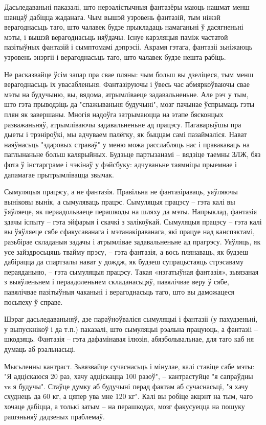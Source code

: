 Дасьледаваньні паказалі, што нерэалістычныя фантазёры маюць нашмат менш шанцаў дабіцца жаданага. Чым вышэй узровень фантазій, тым ніжэй верагоднасьць таго, што чалавек будзе прыкладаць намаганьні ў дасягненьні мэты, і вышэй верагоднасьць няўдачы. Існуе карэляцыя паміж частатой пазітыўных фантазій і сымптомамі дэпрэсіі. Акрамя гэтага, фантазіі зьніжаюць узровень энэргіі і верагоднасьць таго, што чалавек будзе нешта рабіць.

Не расказвайце ўсім запар пра свае пляны: чым больш вы дзеліцеся, тым менш верагоднасьць іх увасабленьня. Фантазіруючы і ўвесь час абмяркоўваючы свае мэты на будучыню, вы, вядома, атрымліваеце задавальненьне. Але рэч у тым, што гэта прыводзіць да "спажываньня будучыні", мозг пачынае ўспрымаць гэты плян як завершаны. Многія надоўга затрымаюцца на этапе бясконцых разважаньняў, атрымліваючы задавальненьне ад працэсу. Пагаварыўшы пра дыеты і трэніроўкі, мы адчуваем палёгку, як быццам самі пазаймаліся. Нават наяўнасьць "здаровых страваў" у меню можа расслабляць нас і правакаваць на паглынаньне больш калярыйных. Будзьце партызанамі – вядзіце таемны ЗЛЖ, бяз фота ў інстарграме і чэкінаў у фэйсбуку: адчуваньне таямніцы прыемнае і дапамагае прытрымлівацца звычак.

Сымуляцыя працэсу, а не фантазія. Правільна не фантазіраваць, уяўляючы выніковы вынік, а сымуляваць працэс. Сымуляцыя працэсу – гэта калі вы ўяўляеце, як пераадольваеце перашкоды на шляху да мэты. Напрыклад, фантазія здачы іспыту – гэта эйфарыя і скачкі з залікоўкай. Сымуляцыя працэсу – гэта калі вы ўяўляеце сябе сфакусаванага і мэтанакіраванага, які працуе над канспэктамі, разьбірае складаныя задачы і атрымлівае задавальненьне ад прагрэсу. Уяўляць, як усе зайздросьцяць твайму прэсу, – гэта фантазія, а вось плянаваць, як будзеш дабірацца да спартзалы нават у дождж, як будзеш супрацьстаяць стрэсаваму пераяданьню, – гэта сымуляцыя працэсу. Такая «нэгатыўная фантазія», зьвязаная з выяўленьнем і пераадоленьнем складанасьцяў, павялічвае веру ў сябе, павялічвае пазітыўныя чаканьні і верагоднасьць таго, што вы даможацеся посьпеху ў справе.

Шэраг дасьледаваньняў, дзе параўноўваліся сымуляцыі і фантазіі (у пахудзеньні, у выпускнікоў і да т.п.) паказалі, што сымуляцыі рэальна працуюць, а фантазіі – шкодзяць. Фантазія – гэта дафамінавая ілюзія, абязбольвальнае, для таго каб ня думаць аб рэальнасьці.

Мысьленны кантраст. Зьвязвайце сучаснасьць і мінулае, калі ставіце сабе мэты: "Я адціскаюся 20 раз, хачу адціскацца 100 разоў", – кантрастуйце "я сапраўдны vs я будучы". Стаўце думку аб будучыні перад фактам аб сучаснасьці, "я хачу схуднець да 60 кг, а цяпер ува мне 120 кг". Калі вы робіце акцэнт на тым, чаго хочаце дабіцца, а толькі затым – на перашкодах, мозг факусуецца на пошуку рашэньняў дадзеных праблемаў.

